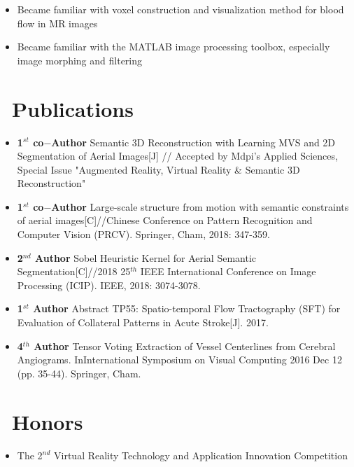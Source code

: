 \documentclass{resume}
\begin{document}

\begin{itemize}
  \item Became familiar with voxel construction and visualization method for blood flow in MR images
  \item Became familiar with the MATLAB image processing toolbox, especially image morphing and filtering
\end{itemize}


\section{\faBookmark\ Publications}
\begin{itemize}
    \item \textbf{1$^{st}$ co$-$Author} Semantic 3D Reconstruction with Learning MVS and 2D Segmentation of Aerial Images[J] // Accepted by Mdpi's Applied Sciences, Special Issue "Augmented Reality, Virtual Reality \& Semantic 3D Reconstruction"
    \item \textbf{1$^{st}$ co$-$Author} Large-scale structure from motion with semantic constraints of aerial images[C]//Chinese Conference on Pattern Recognition and Computer Vision (PRCV). Springer, Cham, 2018: 347-359.
	\item \textbf{2$^{nd}$ Author} Sobel Heuristic Kernel for Aerial Semantic Segmentation[C]//2018 25$^{th}$ IEEE International Conference on Image Processing (ICIP). IEEE, 2018: 3074-3078.
	\item \textbf{1$^{st}$ Author} Abstract TP55: Spatio-temporal Flow Tractography (SFT) for Evaluation of Collateral Patterns in Acute Stroke[J]. 2017.
	\item \textbf{4$^{th}$ Author} Tensor Voting Extraction of Vessel Centerlines from Cerebral Angiograms. InInternational Symposium on Visual Computing 2016 Dec 12 (pp. 35-44). Springer, Cham.
\end{itemize}


\section{\faHeartO\ Honors}

\begin{itemize}
	\item The 2$^{nd}$ Virtual Reality Technology and Application Innovation Competition
\end{itemize}
\end{document}
